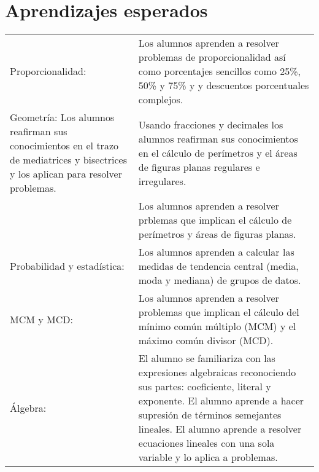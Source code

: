 \documentclass[letterpaper,10pt]{article}
\begin{document}
\newpage

\section{Aprendizajes esperados}
\begin{tabular}[t]{R{0.25\textwidth}p{0.71\textwidth}}
Proporcionalidad: 
                & Los alumnos aprenden a resolver problemas de
                proporcionalidad as\'i como porcentajes sencillos como 25\%, 50\%
                y 75\% y y descuentos porcentuales complejos. \\
Geometr\'ia:     
                Los alumnos reafirman sus conocimientos en el trazo de mediatrices
                y bisectrices y los aplican para resolver problemas.
                & Usando fracciones y decimales los alumnos reafirman sus
                conocimientos en el c\'alculo de  
                per\'imetros y el \'areas de figuras planas regulares e 
                irregulares. \\
                & Los alumnos aprenden a resolver prblemas que implican el
                c\'alculo de per\'imetros y \'areas de figuras planas. \\
Probabilidad y estad\'istica:
                & Los alumnos aprenden a calcular las medidas de tendencia 
                central (media, moda y mediana) de grupos de datos. \\
MCM y MCD: &    Los alumnos aprenden a resolver problemas que implican el 
                c\'alculo del m\'inimo com\'un m\'ultiplo (MCM) y el m\'aximo 
                com\'un divisor (MCD). \\
\'Algebra: &    El alumno se familiariza con las expresiones 
                algebraicas reconociendo sus partes: coeficiente, literal y
                exponente. El alumno aprende a hacer supresi\'on de t\'erminos
                semejantes lineales. El alumno aprende a resolver ecuaciones
                lineales con una sola variable y lo aplica a problemas.
\end{tabular}
\end{document}
